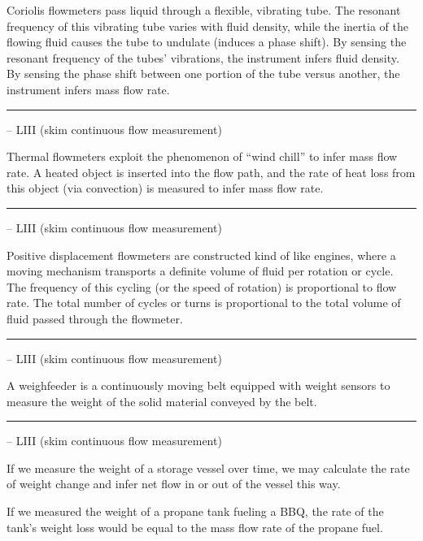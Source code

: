 \begin{itemize}
\begin{itemize}
Coriolis flowmeters pass liquid through a flexible, vibrating tube.  The resonant frequency of this vibrating tube varies with fluid density, while the inertia of the flowing fluid causes the tube to undulate (induces a phase shift).  By sensing the resonant frequency of the tubes' vibrations, the instrument infers fluid density.  By sensing the phase shift between one portion of the tube versus another, the instrument infers mass flow rate.

\vskip 5pt \hrule \vskip 5pt  -- LIII (skim continuous flow measurement) \vskip 10pt

Thermal flowmeters exploit the phenomenon of ``wind chill'' to infer mass flow rate.  A heated object is inserted into the flow path, and the rate of heat loss from this object (via convection) is measured to infer mass flow rate.

\vskip 5pt \hrule \vskip 5pt  -- LIII (skim continuous flow measurement) \vskip 10pt

Positive displacement flowmeters are constructed kind of like engines, where a moving mechanism transports a definite volume of fluid per rotation or cycle.  The frequency of this cycling (or the speed of rotation) is proportional to flow rate.  The total number of cycles or turns is proportional to the total volume of fluid passed through the flowmeter.

\vskip 5pt \hrule \vskip 5pt  -- LIII (skim continuous flow measurement) \vskip 10pt

A weighfeeder is a continuously moving belt equipped with weight sensors to measure the weight of the solid material conveyed by the belt.

\vskip 5pt \hrule \vskip 5pt  -- LIII (skim continuous flow measurement) \vskip 10pt

If we measure the weight of a storage vessel over time, we may calculate the rate of weight change and infer net flow in or out of the vessel this way.

\vskip 10pt

If we measured the weight of a propane tank fueling a BBQ, the rate of the tank's weight loss would be equal to the mass flow rate of the propane fuel.


\end{itemize}
\end{itemize}
